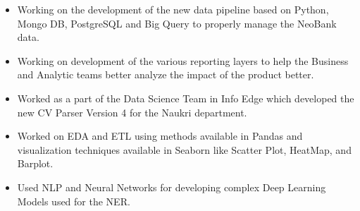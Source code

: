 \documentclass[11pt,b4paper,ragged2e]{altacv}
\begin{document}

\begin{fullwidth}
\makecvheader
\end{fullwidth}



\begin{itemize}
    \item Working on the development of the new data pipeline based on Python, Mongo DB, PostgreSQL and Big Query to properly manage the NeoBank data.
    \item Working on development of the various reporting layers to help the Business and Analytic teams better analyze the impact of the product better.
    \end{itemize} \medskip
    

\begin{itemize}
    \item Worked as a part of the Data Science Team in Info Edge which developed the new CV Parser Version 4 for the Naukri department.
    \item Worked on EDA and ETL using methods available in Pandas and visualization techniques available in Seaborn like Scatter Plot, HeatMap, and Barplot.
    \item Used NLP and Neural Networks for developing complex Deep Learning Models used for the NER.
    \end{itemize} \medskip
    
\end{document}
